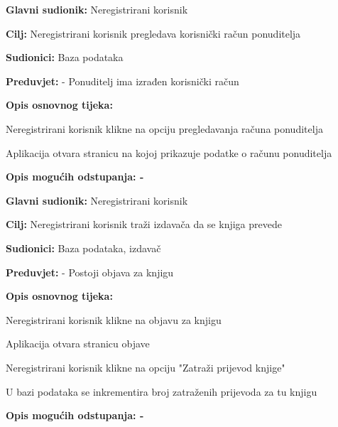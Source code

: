                     \noindent {}
					\begin{packed_item}
	
						\item \textbf{Glavni sudionik: } Neregistrirani korisnik
						\item  \textbf{Cilj:} Neregistrirani korisnik pregledava korisnički račun ponuditelja
						\item  \textbf{Sudionici:} Baza podataka
						\item  \textbf{Preduvjet:} - Ponuditelj ima izrađen korisnički račun
						\item  \textbf{Opis osnovnog tijeka:}
						
						\item[] \begin{packed_enum}
	
							\item Neregistrirani korisnik klikne na opciju pregledavanja računa ponuditelja
                            \item Aplikacija otvara stranicu na kojoj prikazuje podatke o računu ponuditelja
						\end{packed_enum}
						
						\item  \textbf{Opis mogućih odstupanja: -}
					\end{packed_item}

                    \noindent {}
					\begin{packed_item}
	
						\item \textbf{Glavni sudionik: } Neregistrirani korisnik
						\item  \textbf{Cilj:} Neregistrirani korisnik traži izdavača da se knjiga prevede
						\item  \textbf{Sudionici:} Baza podataka, izdavač
						\item  \textbf{Preduvjet:} - Postoji objava za knjigu
						\item  \textbf{Opis osnovnog tijeka:}
						
						\item[] \begin{packed_enum}
	
							\item Neregistrirani korisnik klikne na objavu za knjigu
                            \item Aplikacija otvara stranicu objave 
							\item Neregistrirani korisnik klikne na opciju "Zatraži prijevod knjige"
                            \item U bazi podataka se inkrementira broj zatraženih prijevoda za tu knjigu
						\end{packed_enum}
						
						\item  \textbf{Opis mogućih odstupanja: -}
					\end{packed_item}

